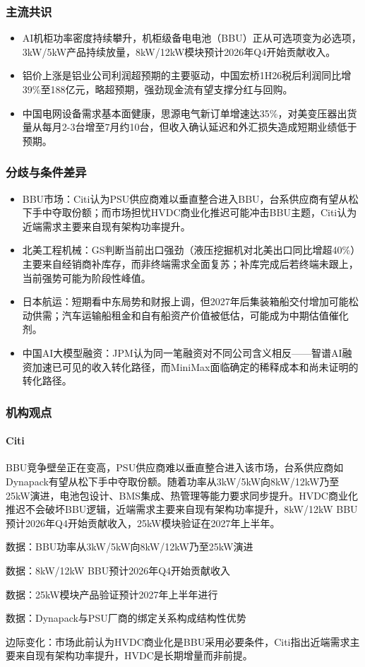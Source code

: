 \documentclass[11pt]{ctexart}
\begin{document}
\subsubsection*{主流共识}
\begin{itemize}
  \item AI机柜功率密度持续攀升，机柜级备电电池（BBU）正从可选项变为必选项，3kW/5kW产品持续放量，8kW/12kW模块预计2026年Q4开始贡献收入。
  \item 铝价上涨是铝业公司利润超预期的主要驱动，中国宏桥1H26税后利润同比增39\%至188亿元，略超预期，强劲现金流有望支撑分红与回购。
  \item 中国电网设备需求基本面健康，思源电气新订单增速达35\%，对美变压器出货量从每月2-3台增至7月约10台，但收入确认延迟和外汇损失造成短期业绩低于预期。
\end{itemize}
\subsubsection*{分歧与条件差异}
\begin{itemize}
  \item BBU市场：Citi认为PSU供应商难以垂直整合进入BBU，台系供应商有望从松下手中夺取份额；而市场担忧HVDC商业化推迟可能冲击BBU主题，Citi认为近端需求主要来自现有架构功率提升。
  \item 北美工程机械：GS判断当前出口强劲（液压挖掘机对北美出口同比增超40\%）主要来自经销商补库存，而非终端需求全面复苏；补库完成后若终端未跟上，当前强势可能为阶段性峰值。
  \item 日本航运：短期看中东局势和财报上调，但2027年后集装箱船交付增加可能松动供需；汽车运输船租金和自有船资产价值被低估，可能成为中期估值催化剂。
  \item 中国AI大模型融资：JPM认为同一笔融资对不同公司含义相反——智谱AI融资加速已可见的收入转化路径，而MiniMax面临确定的稀释成本和尚未证明的转化路径。
\end{itemize}
\subsubsection*{机构观点}
\paragraph{Citi} BBU竞争壁垒正在变高，PSU供应商难以垂直整合进入该市场，台系供应商如Dynapack有望从松下手中夺取份额。随着功率从3kW/5kW向8kW/12kW乃至25kW演进，电池包设计、BMS集成、热管理等能力要求同步提升。HVDC商业化推迟不会破坏BBU逻辑，近端需求主要来自现有架构功率提升，8kW/12kW BBU预计2026年Q4开始贡献收入，25kW模块验证在2027年上半年。
{\small\color{refgray}数据：BBU功率从3kW/5kW向8kW/12kW乃至25kW演进\par}
{\small\color{refgray}数据：8kW/12kW BBU预计2026年Q4开始贡献收入\par}
{\small\color{refgray}数据：25kW模块产品验证预计2027年上半年进行\par}
{\small\color{refgray}数据：Dynapack与PSU厂商的绑定关系构成结构性优势\par}
{\small\color{refgray}边际变化：市场此前认为HVDC商业化是BBU采用必要条件，Citi指出近端需求主要来自现有架构功率提升，HVDC是长期增量而非前提。\par}
\end{document}
